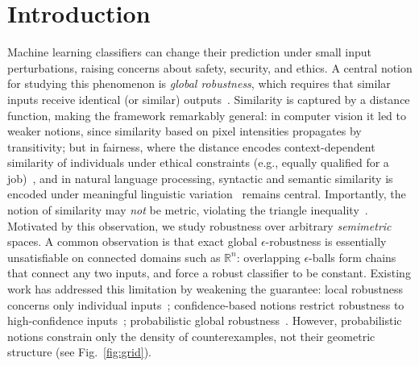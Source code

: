 \section{Introduction}

Machine learning classifiers can change their prediction under small input perturbations, raising concerns about safety, security, and ethics. 
A central notion for studying this phenomenon is \emph{global robustness}, which requires that similar inputs receive identical (or similar) outputs~\cite{casadio2022neural}. 
Similarity is captured by a distance function, making the framework remarkably general: in computer vision it led to weaker notions, since similarity based on pixel intensities propagates by transitivity; but
in fairness, where the distance encodes context-dependent similarity of individuals under ethical constraints (e.g., equally qualified for a job)~\cite{fairness-landscape,kusner2017counterfactual,ranking-fairness}, and in natural language processing, syntactic and semantic similarity is encoded under meaningful linguistic variation~\cite{levy2025statistical} remains central.
Importantly, the notion of similarity may \emph{not} be metric, violating the triangle inequality~\cite{garcia2019learning,similarity-guide}.
Motivated by this observation, we study robustness over arbitrary \emph{semimetric} spaces.
A common observation is that exact global $\epsilon$-robustness is essentially unsatisfiable on connected domains such as $\mathbb{R}^n$: overlapping $\epsilon$-balls form chains that connect any two inputs, and force a robust classifier to be constant. 
Existing work has addressed this limitation by weakening the guarantee: 
local robustness concerns only individual inputs~\cite{li2024certifying}; confidence-based notions restrict robustness to high-confidence
inputs~\cite{athavale2024verifying,leino2021globally}; probabilistic global robustness~\cite{mangal2019robustness,levy2023groma}.
However, probabilistic notions constrain only the density of counterexamples, not their geometric structure (see Fig.~\ref{fig:grid}).

